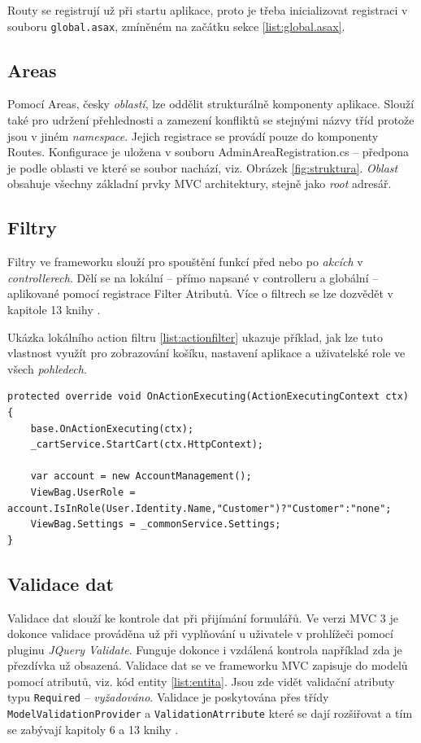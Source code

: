 \documentclass[11pt,twoside,a4paper]{book}
\begin{document}
Routy se registrují už při startu aplikace, proto je třeba inicializovat registraci v souboru \texttt{global.asax}, zmíněném na začátku sekce \ref{list:global.asax}.

\subsection{Areas}
\label{sec:areas}
Pomocí \textsf{Areas}, česky \textit{oblastí}, lze oddělit strukturálně komponenty aplikace. Slouží také pro udržení přehlednosti a zamezení konfliktů se stejnými názvy tříd protože jsou v jiném \textit{namespace}. Jejich registrace se provádí pouze do komponenty \textsf{Routes}. Konfigurace je uložena v souboru AdminAreaRegistration.cs -- předpona je podle oblasti ve které se soubor nachází, viz. Obrázek \ref{fig:struktura}. \textit{Oblast} obsahuje všechny základní prvky MVC architektury, stejně jako \textit{root} adresář.

\subsection{Filtry}
Filtry ve frameworku slouží pro spouštění funkcí před nebo po \textit{akcích} v \textit{controllerech}. Dělí se na lokální -- přímo napsané v controlleru a globální -- aplikované pomocí registrace \textsf{Filter Atributů}. Více o filtrech se lze dozvědět v kapitole 13 knihy \cite{MVC2}.

Ukázka lokálního action filtru \ref{list:actionfilter} ukazuje příklad, jak lze tuto vlastnost využít pro zobrazování košíku, nastavení aplikace a uživatelské role ve všech \textit{pohledech}.

\begin{lstlisting}[float=h!,language=CSharp, caption={Action Filter}, label=list:actionfilter]
protected override void OnActionExecuting(ActionExecutingContext ctx)
{
	base.OnActionExecuting(ctx);
	_cartService.StartCart(ctx.HttpContext);

	var account = new AccountManagement();
	ViewBag.UserRole = account.IsInRole(User.Identity.Name,"Customer")?"Customer":"none";
	ViewBag.Settings = _commonService.Settings;
}
\end{lstlisting}

\subsection{Validace dat}
\label{sec:validacedat}
Validace dat slouží ke kontrole dat při přijímání formulářů. Ve verzi MVC 3 je dokonce validace prováděna už při vyplňování u uživatele v prohlížeči pomocí pluginu \textit{JQuery Validate}. Funguje dokonce i vzdálená kontrola například zda je přezdívka už obsazená. Validace dat se ve frameworku MVC zapisuje do modelů pomocí atributů, viz. kód entity \ref{list:entita}. Jsou zde vidět validační atributy typu \texttt{Required} -- \textit{vyžadováno}. Validace je poskytována přes třídy \texttt{ModelValidationProvider} a \texttt{ValidationAtrribute} které se dají rozšiřovat a tím se zabývají kapitoly 6 a 13 knihy \cite{MVC1}.
\end{document}

